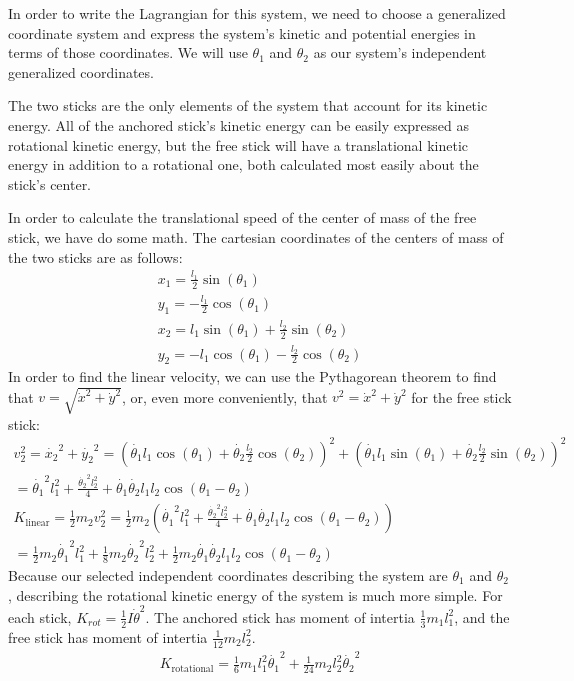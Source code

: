 \documentclass[]{article}
\begin{document}
In order to write the Lagrangian for this system, we need to choose a generalized coordinate system and express the system's kinetic and potential energies in terms of those coordinates. We will use $\theta_1$ and $\theta_2$ as our system's independent generalized coordinates.

The two sticks are the only elements of the system that account for its kinetic energy. All of the anchored stick's kinetic energy can be easily expressed as rotational kinetic energy, but the free stick will have a translational kinetic energy in addition to a rotational one, both calculated most easily about the stick's center.

In order to calculate the translational speed of the center of mass of the free stick, we have do some math. The cartesian coordinates of the centers of mass of the two sticks are as follows:
\begin{gather*}
x_1 = \frac{l_1}{2}\sin(\theta_1) \\
y_1 = -\frac{l_1}{2}\cos(\theta_1) \\
x_2 = l_1\sin(\theta_1) + \frac{l_2}{2}\sin(\theta_2) \\
y_2 = -l_1\cos(\theta_1) - \frac{l_2}{2}\cos(\theta_2)
\end{gather*}
In order to find the linear velocity, we can use the Pythagorean theorem to find that $v = \sqrt{\dot{x}^2 + \dot{y}^2}$, or, even more conveniently, that $v^2 = \dot{x}^2 + \dot{y}^2$ for the free stick stick:
\begin{gather*}
	v_2^2 = \dot{x_2}^2 + \dot{y_2}^2 = (\dot{\theta_1}l_1\cos(\theta_1) + \dot{\theta_2}\frac{l_2}{2}\cos(\theta_2))^2 + (\dot{\theta_1}l_1\sin(\theta_1) + \dot{\theta_2}\frac{l_2}{2}\sin(\theta_2))^2 \\
	= \dot{\theta_1}^2l_1^2 + \frac{\dot{\theta_2}^2l_2^2}{4} + \dot{\theta_1}\dot{\theta_2}l_1l_2\cos(\theta_1 - \theta_2) \\
	K_{\text{linear}} = \frac12m_2v_2^2 = \frac12m_2(\dot{\theta_1}^2l_1^2 + \frac{\dot{\theta_2}^2l_2^2}{4} + \dot{\theta_1}\dot{\theta_2}l_1l_2\cos(\theta_1 - \theta_2)) \\
	= \frac12m_2\dot{\theta_1}^2l_1^2 + \frac18m_2\dot{\theta_2}^2l_2^2 + \frac12m_2\dot{\theta_1}\dot{\theta_2}l_1l_2\cos(\theta_1 - \theta_2)
\end{gather*}
Because our selected independent coordinates describing the system are $\theta_1$ and $\theta_2$, describing the rotational kinetic energy of the system is much more simple. For each stick, $K_{rot} = \frac12 I \dot{\theta}^2$. The anchored stick has moment of intertia $\frac13m_1l_1^2$, and the free stick has moment of intertia $\frac{1}{12}m_2l_2^2$.
\begin{gather*}
	K_{\text{rotational}} = \frac16m_1l_1^2\dot{\theta_1}^2 + \frac{1}{24}m_2l_2^2\dot{\theta_2}^2
\end{gather*}
\end{document}
